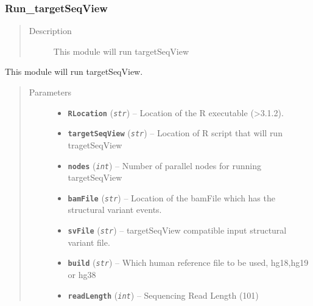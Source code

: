 \documentclass[letterpaper,10pt,english]{sphinxmanual}
\begin{document}
\subsubsection{Run\_targetSeqView}
\label{iCallSV:run-targetseqview}\begin{quote}\begin{description}
\item[{Description}] \leavevmode
This module will run targetSeqView

\end{description}\end{quote}

\begin{fulllineitems}
\label{iCallSV:iCallSV.Run_targetSeqView.run}
This module will run targetSeqView.
\begin{quote}\begin{description}
\item[{Parameters}] \leavevmode\begin{itemize}
\item {} 
\textbf{\texttt{RLocation}} (\emph{\texttt{str}}) -- Location of the R executable (\textgreater{}3.1.2).

\item {} 
\textbf{\texttt{targetSeqView}} (\emph{\texttt{str}}) -- Location of R script that will run tragetSeqView

\item {} 
\textbf{\texttt{nodes}} (\emph{\texttt{int}}) -- Number of parallel nodes for running targetSeqView

\item {} 
\textbf{\texttt{bamFile}} (\emph{\texttt{str}}) -- Location of the bamFile which has the  structural variant events.

\item {} 
\textbf{\texttt{svFile}} (\emph{\texttt{str}}) -- targetSeqView compatible input structural variant file.

\item {} 
\textbf{\texttt{build}} (\emph{\texttt{str}}) -- Which human reference file to be used, hg18,hg19 or hg38

\item {} 
\textbf{\texttt{readLength}} (\emph{\texttt{int}}) -- Sequencing Read Length (101)


\end{itemize}
\end{description}
\end{quote}
\end{fulllineitems}
\end{document}
